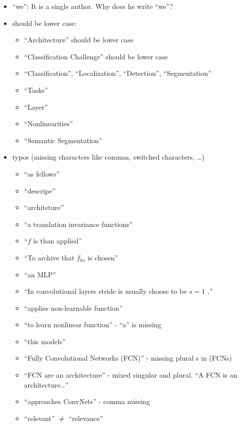 \documentclass[a4paper,9pt]{scrartcl}
\begin{document}
\begin{itemize}
    \item \enquote{we}: It is a single author. Why does he write \enquote{we}?
    \item should be lower case:
    \begin{itemize}
        \item \enquote{Architecture} should be lower case
        \item \enquote{Classification Challenge} should be lower case
        \item \enquote{Classification}, \enquote{Localization}, \enquote{Detection}, \enquote{Segmentation}
        \item \enquote{Tasks}
        \item \enquote{Layer}
        \item \enquote{Nonlinearities}
        \item \enquote{Semantic Segmentation}
    \end{itemize}
    \item typos (missing characters like commas, switched characters, \dots)
    \begin{itemize}
        \item \enquote{as fellows}
        \item \enquote{descripe}
        \item \enquote{architeture}
        \item \enquote{a translation invariance functions}
        \item \enquote{$f$ is than applied}
        \item \enquote{To archive that $f_{ks}$ is chosen}
        \item \enquote{an MLP}
        \item \enquote{In convolutional layers stride is usually choose to be $s = 1$ ,}
        \item \enquote{applies non-learnable function}
        \item \enquote{to learn nonlinear function} - \enquote{a} is missing
        \item \enquote{this models}
        \item \enquote{Fully Convolutional Networks (FCN)} - missing plural s in (FCNs)
        \item \enquote{FCN are an architecture} - mixed singular and plural. \enquote{A FCN is an architecture\dots}
        \item \enquote{approaches ConvNets} - comma missing
        \item \enquote{relevant} $\neq$ \enquote{relevance}

\end{itemize}
\end{itemize}
\end{document}
